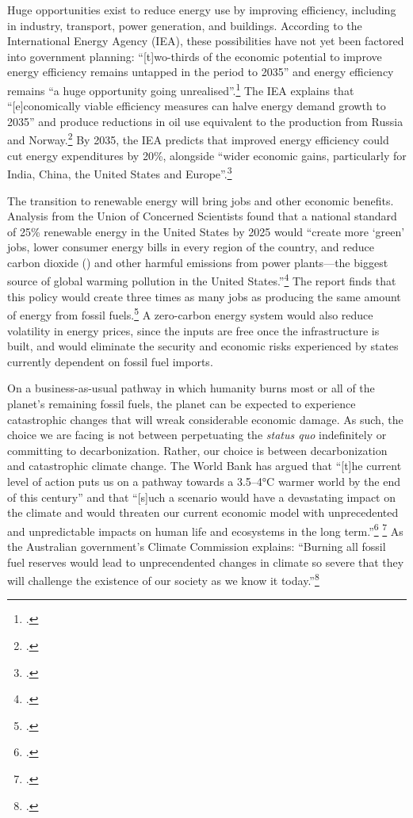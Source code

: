 Huge opportunities exist to reduce energy use by improving efficiency, including in industry, transport, power generation, and buildings.
According to the International Energy Agency (IEA), these possibilities have not yet been factored into government planning: ``[t]wo-thirds of the economic potential to improve energy efficiency remains untapped in the period to 2035'' and energy efficiency remains ``a huge opportunity going unrealised''.\footcite[][p. 13]{IEA2012press}
The IEA explains that ``[e]conomically viable efficiency measures can halve energy demand growth to 2035'' and produce reductions in oil use equivalent to the production from Russia and Norway.\footcite[][p. 14]{IEA2012press}
By 2035, the IEA predicts that improved energy efficiency could cut energy expenditures by 20\%, alongside ``wider economic gains, particularly for India, China, the United States and Europe''.\footcite[][p. 15]{IEA2012press}



The transition to renewable energy will bring jobs and other economic benefits.
Analysis from the Union of Concerned Scientists found that a national standard of 25\% renewable energy in the United States by 2025 would ``create more `green' jobs, lower consumer energy bills in every region of the country, and reduce carbon dioxide () and other harmful emissions from power plants—the biggest source of global warming pollution in the United States.''\footcite[][]{ConcernedScientistsJobs}
The report finds that this policy would create three times as many jobs as producing the same amount of energy from fossil fuels.\footcite[See also: ][]{CSBenefitsRenewable}
A zero-carbon energy system would also reduce volatility in energy prices, since the inputs are free once the infrastructure is built, and would eliminate the security and economic risks experienced by states currently dependent on fossil fuel imports.



On a business-as-usual pathway in which humanity burns most or all of the planet's remaining fossil fuels, the planet can be expected to experience catastrophic changes that will wreak considerable economic damage.
As such, the choice we are facing is not between perpetuating the \emph{status quo} indefinitely or committing to decarbonization.
Rather, our choice is between decarbonization and catastrophic climate change.
The World Bank has argued that ``[t]he current level of action puts us on a pathway towards a 3.5–4°C warmer world by the end of this century'' and that ``[s]uch a scenario would have a devastating impact on the climate and would threaten our current economic model with unprecedented and unpredictable impacts on human life and ecosystems in the long term.''\footcite[][p. 13]{WorldBankCarbonPricing} \footcite[See also:][]{WoesReverse}
As the Australian government's Climate Commission explains: ``Burning all fossil fuel reserves would lead to unprecendented changes in climate so severe that they will challenge the existence of our society as we know it today.''\footcite[][p. 5]{CriticalDecade2013}


